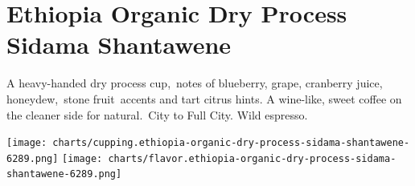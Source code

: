 \documentclass[10pt,twoside,footinclude=true,headinclude=true]{scrbook} %
\begin{document}

\chapter*{Ethiopia Organic Dry Process Sidama Shantawene}
 
\begin{addmargin}[2.2em]{2.2em}
\small
\justify
A heavy-handed dry process cup, notes of blueberry, grape, cranberry juice, honeydew, stone fruit accents and tart citrus hints. A wine-like, sweet coffee on the cleaner side for natural. City to Full City. Wild espresso.
\end{addmargin}

\centering
\vspace{3mm}
\texttt{[image: charts/cupping.ethiopia-organic-dry-process-sidama-shantawene-6289.png]}
\texttt{[image: charts/flavor.ethiopia-organic-dry-process-sidama-shantawene-6289.png]}
\end{document}
